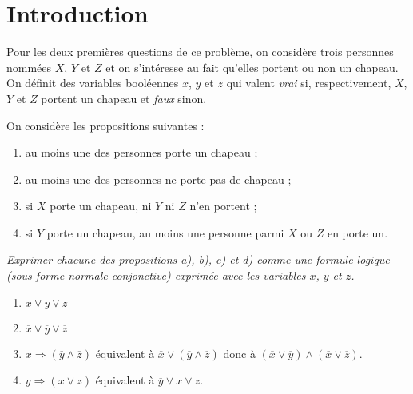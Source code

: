 \section{Introduction}
Pour les deux premières questions de ce problème, on considère trois personnes nommées $X$, $Y$ et $Z$ et on s’intéresse au fait qu’elles portent ou non un chapeau. On définit des variables booléennes $x$, $y$ et $z$ qui valent {\it vrai} si, respectivement, $X$, $Y$ et $Z$ portent un chapeau et {\it faux} sinon.

On considère les propositions suivantes :
\begin{enumerate}[label=\alph*)]
  \item au moins une des personnes porte un chapeau ;
  \item au moins une des personnes ne porte pas de chapeau ;
  \item si $X$ porte un chapeau, ni $Y$ ni $Z$ n’en portent ;
  \item si $Y$ porte un chapeau, au moins une personne parmi $X$ ou $Z$ en porte un.
\end{enumerate}
\begin{Exercise}\it
Exprimer chacune des propositions a), b), c) et d) comme une formule logique  (sous forme normale conjonctive) exprimée avec les variables $x$, $y$ et $z$.
\end{Exercise}
\begin{Answer}
\begin{enumerate}[label=\alph*)]
  \item $x \lor y \lor z $
  \item $\overline x \lor \overline y \lor \overline z$
  \item $x \Rightarrow (\overline y \land \overline z)$ équivalent à $\overline x \lor (\overline y \land \overline z)$
  donc à $(\overline x \lor \overline y) \land (\overline x \lor \overline z)$.
  \item $y \Rightarrow (x \lor z)$ équivalent à $\overline y \lor x \lor z$.
\end{enumerate}
\end{Answer}
